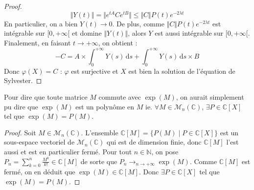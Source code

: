 \begin{proof}
    \[ \Vert Y(t) \Vert = \Vert e^{tA} C e^{tB} \Vert \leq \Vert C \Vert P(t) e^{-2 \lambda t} \]
    En particulier, on a bien $Y(t) \longrightarrow 0$. De plus, comme $\Vert C \Vert P(t) e^{-2 \lambda t}$ est intégrable sur $[0, +\infty[$ et domine $\Vert Y(t) \Vert$, alors $Y$ est aussi intégrable sur $[0, +\infty[$. Finalement, en faisant $t \longrightarrow +\infty$, on obtient :
    \[ -C = A \times \int_{0}^{+\infty} Y(s) \, \mathrm{d}s + \int_{0}^{+\infty} Y(s) \, \mathrm{d}s \times B \]
    Donc $\varphi(X) = C$ : $\varphi$ est surjective et $X$ est bien la solution de l'équation de Sylvester.
  \end{proof}


  \begin{remark}
    Pour dire que toute matrice $M$ commute avec $\exp(M)$, on aurait simplement pu dire que $\exp(M)$ est un polynôme en $M$ ie. $\forall M \in \mathcal{M}_n(\mathbb{C})$, $\exists P \in \mathbb{C}[X]$ tel que $\exp(M) = P(M)$.
  \end{remark}

  \begin{proof}
    Soit $M \in \mathcal{M}_n(\mathbb{C})$. L'ensemble $\mathbb{C}[M] = \{ P(M) \mid P \in \mathbb{C}[X] \}$ est un sous-espace vectoriel de $\mathcal{M}_n(\mathbb{C})$ qui est de dimension finie, donc $\mathbb{C}[M]$ l'est aussi et est en particulier fermé.
    \newpar
    Pour tout $n \in \mathbb{N}$, on pose $P_n = \sum_{k=0}^n \frac{M^k}{k!} \in \mathbb{C}[M]$ de sorte que $P_n \longrightarrow_{n \rightarrow +\infty} \exp(M)$. Comme $\mathbb{C}[M]$ est fermé, on en déduit que $\exp(M) \in \mathbb{C}[M]$. Donc $\exists P \in \mathbb{C}[X]$ tel que $\exp(M) = P(M)$.
  \end{proof}

